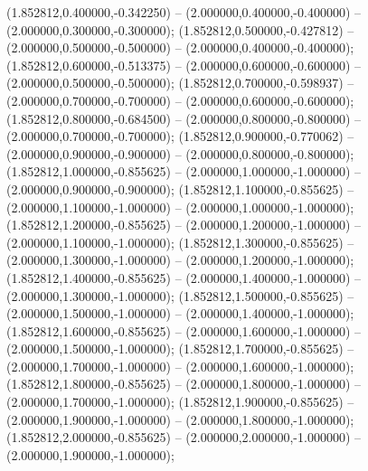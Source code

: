  (1.852812,0.400000,-0.342250) -- (2.000000,0.400000,-0.400000) -- (2.000000,0.300000,-0.300000);
 (1.852812,0.500000,-0.427812) -- (2.000000,0.500000,-0.500000) -- (2.000000,0.400000,-0.400000);
 (1.852812,0.600000,-0.513375) -- (2.000000,0.600000,-0.600000) -- (2.000000,0.500000,-0.500000);
 (1.852812,0.700000,-0.598937) -- (2.000000,0.700000,-0.700000) -- (2.000000,0.600000,-0.600000);
 (1.852812,0.800000,-0.684500) -- (2.000000,0.800000,-0.800000) -- (2.000000,0.700000,-0.700000);
 (1.852812,0.900000,-0.770062) -- (2.000000,0.900000,-0.900000) -- (2.000000,0.800000,-0.800000);
 (1.852812,1.000000,-0.855625) -- (2.000000,1.000000,-1.000000) -- (2.000000,0.900000,-0.900000);
 (1.852812,1.100000,-0.855625) -- (2.000000,1.100000,-1.000000) -- (2.000000,1.000000,-1.000000);
 (1.852812,1.200000,-0.855625) -- (2.000000,1.200000,-1.000000) -- (2.000000,1.100000,-1.000000);
 (1.852812,1.300000,-0.855625) -- (2.000000,1.300000,-1.000000) -- (2.000000,1.200000,-1.000000);
 (1.852812,1.400000,-0.855625) -- (2.000000,1.400000,-1.000000) -- (2.000000,1.300000,-1.000000);
 (1.852812,1.500000,-0.855625) -- (2.000000,1.500000,-1.000000) -- (2.000000,1.400000,-1.000000);
 (1.852812,1.600000,-0.855625) -- (2.000000,1.600000,-1.000000) -- (2.000000,1.500000,-1.000000);
 (1.852812,1.700000,-0.855625) -- (2.000000,1.700000,-1.000000) -- (2.000000,1.600000,-1.000000);
 (1.852812,1.800000,-0.855625) -- (2.000000,1.800000,-1.000000) -- (2.000000,1.700000,-1.000000);
 (1.852812,1.900000,-0.855625) -- (2.000000,1.900000,-1.000000) -- (2.000000,1.800000,-1.000000);
 (1.852812,2.000000,-0.855625) -- (2.000000,2.000000,-1.000000) -- (2.000000,1.900000,-1.000000);
